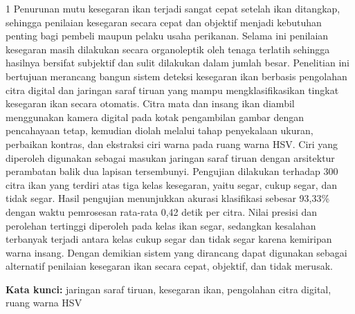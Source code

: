 \begin{spacing}{1}
Penurunan mutu kesegaran ikan terjadi sangat cepat setelah ikan
ditangkap, sehingga penilaian kesegaran secara cepat dan objektif
menjadi kebutuhan penting bagi pembeli maupun pelaku usaha perikanan.
Selama ini penilaian kesegaran masih dilakukan secara organoleptik
oleh tenaga terlatih sehingga hasilnya bersifat subjektif dan sulit
dilakukan dalam jumlah besar. Penelitian ini bertujuan merancang
bangun sistem deteksi kesegaran ikan berbasis pengolahan citra digital
dan jaringan saraf tiruan yang mampu mengklasifikasikan tingkat
kesegaran ikan secara otomatis. Citra mata dan insang ikan diambil
menggunakan kamera digital pada kotak pengambilan gambar dengan
pencahayaan tetap, kemudian diolah melalui tahap penyekalaan ukuran,
perbaikan kontras, dan ekstraksi ciri warna pada ruang warna HSV.
Ciri yang diperoleh digunakan sebagai masukan jaringan saraf tiruan
dengan arsitektur perambatan balik dua lapisan tersembunyi. Pengujian
dilakukan terhadap 300 citra ikan yang terdiri atas tiga kelas
kesegaran, yaitu segar, cukup segar, dan tidak segar. Hasil pengujian
menunjukkan akurasi klasifikasi sebesar 93,33\% dengan waktu
pemrosesan rata-rata 0,42 detik per citra. Nilai presisi dan perolehan
tertinggi diperoleh pada kelas ikan segar, sedangkan kesalahan
terbanyak terjadi antara kelas cukup segar dan tidak segar karena
kemiripan warna insang. Dengan demikian sistem yang dirancang dapat
digunakan sebagai alternatif penilaian kesegaran ikan secara cepat,
objektif, dan tidak merusak.

\vspace{3\baselineskip}

\noindent
\textbf{Kata kunci:} jaringan saraf tiruan, kesegaran ikan, pengolahan
citra digital, ruang warna HSV
\end{spacing}
